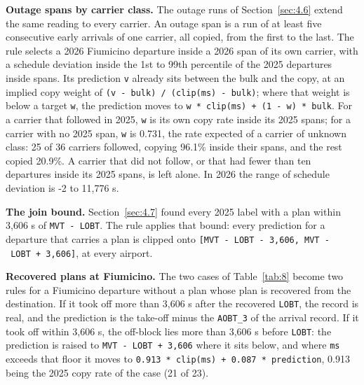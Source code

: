 \documentclass[
  manuscript=article,
  layout=preprint,
  year=2026,
  volume=x,
]{extra/joas}
\begin{document}
\textbf{Outage spans by carrier class.} The outage runs of Section~\ref{sec:4.6} extend the same reading to every carrier. An outage span is a run of at least five consecutive early arrivals of one carrier, all copied, from the first to the last. The rule selects a 2026 Fiumicino departure inside a 2026 span of its own carrier, with a schedule deviation inside the 1st to 99th percentile of the 2025 departures inside spans. Its prediction \texttt{v} already sits between the bulk and the copy, at an implied copy weight of \texttt{(v\ -\ bulk)\ /\ (clip(ms)\ -\ bulk)}; where that weight is below a target \texttt{w}, the prediction moves to \texttt{w\ *\ clip(ms)\ +\ (1\ -\ w)\ *\ bulk}. For a carrier that followed in 2025, \texttt{w} is its own copy rate inside its 2025 spans; for a carrier with no 2025 span, \texttt{w} is 0.731, the rate expected of a carrier of unknown class: 25 of 36 carriers followed, copying 96.1\% inside their spans, and the rest copied 20.9\%. A carrier that did not follow, or that had fewer than ten departures inside its 2025 spans, is left alone. In 2026 the range of schedule deviation is -2 to 11,776 s.

\textbf{The join bound.} Section~\ref{sec:4.7} found every 2025 label with a plan within 3,606 s of \texttt{MVT\ -\ LOBT}. The rule applies that bound: every prediction for a departure that carries a plan is clipped onto \texttt{{[}MVT\ -\ LOBT\ -\ 3,606,\ MVT\ -\ LOBT\ +\ 3,606{]}}, at every airport.

\textbf{Recovered plans at Fiumicino.} The two cases of Table~\ref{tab:8} become two rules for a Fiumicino departure without a plan whose plan is recovered from the destination. If it took off more than 3,606 s after the recovered \texttt{LOBT}, the record is real, and the prediction is the take-off minus the \texttt{AOBT\_3} of the arrival record. If it took off within 3,606 s, the off-block lies more than 3,606 s before \texttt{LOBT}: the prediction is raised to \texttt{MVT\ -\ LOBT\ +\ 3,606} where it sits below, and where \texttt{ms} exceeds that floor it moves to \texttt{0.913\ *\ clip(ms)\ +\ 0.087\ *\ prediction}, 0.913 being the 2025 copy rate of the case (21 of 23).
\end{document}
